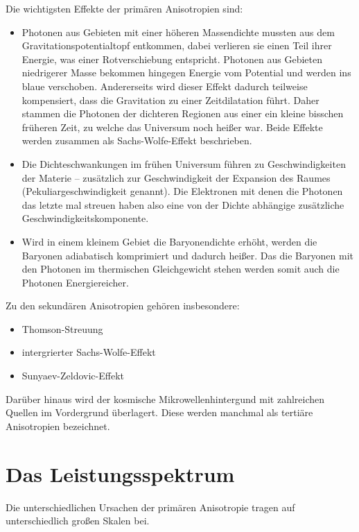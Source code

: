 \documentclass[10pt,a4paper]{article}
\begin{document}
Die wichtigsten Effekte der primären Anisotropien sind:
\begin{itemize}
\item Photonen aus Gebieten mit einer höheren Massendichte mussten aus dem Gravitationspotentialtopf entkommen, dabei verlieren sie einen Teil ihrer Energie, was einer Rotverschiebung entspricht. Photonen aus Gebieten niedrigerer Masse bekommen hingegen Energie vom Potential und werden ins blaue verschoben. Andererseits wird dieser Effekt dadurch teilweise kompensiert, dass die Gravitation zu einer Zeitdilatation führt. Daher stammen die Photonen der dichteren Regionen aus einer ein kleine bisschen früheren Zeit, zu welche das Universum noch heißer war. Beide Effekte werden zusammen als Sachs-Wolfe-Effekt beschrieben.
\item Die Dichteschwankungen im frühen Universum führen zu Geschwindigkeiten der Materie -- zusätzlich zur Geschwindigkeit der Expansion des Raumes (Pekuliargeschwindigkeit genannt). Die Elektronen mit denen die Photonen das letzte mal streuen haben also eine von der Dichte abhängige zusätzliche Geschwindigkeitskomponente. %
\item Wird in einem kleinem Gebiet die Baryonendichte erhöht, werden die Baryonen adiabatisch komprimiert und dadurch heißer. Das die Baryonen mit den Photonen im thermischen Gleichgewicht stehen werden somit auch die Photonen Energiereicher.
\end{itemize}

Zu den sekundären Anisotropien gehören insbesondere:
\begin{itemize}
\item Thomson-Streuung
\item intergrierter Sachs-Wolfe-Effekt
\item Sunyaev-Zeldovic-Effekt
\end{itemize}

Darüber hinaus wird der kosmische Mikrowellenhintergund mit zahlreichen Quellen im Vordergrund überlagert. Diese werden manchmal als tertiäre Anisotropien bezeichnet.

\section{Das Leistungsspektrum}
Die unterschiedlichen Ursachen der primären Anisotropie tragen auf unterschiedlich großen Skalen bei.
\end{document}
